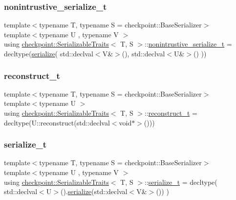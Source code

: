 \subsubsection{\texorpdfstring{nonintrustive\+\_\+serialize\+\_\+t}{nonintrustive\_serialize\_t}}
{\footnotesize\ttfamily template$<$typename T, typename S = checkpoint\+::\+Base\+Serializer$>$ \\
template$<$typename U , typename V $>$ \\
using \hyperlink{structcheckpoint_1_1_serializable_traits}{checkpoint\+::\+Serializable\+Traits}$<$ T, S $>$\+::\hyperlink{structcheckpoint_1_1_serializable_traits_a3284d2cfd29cfe429d5cf76186d3fe3c}{nonintrustive\+\_\+serialize\+\_\+t} =  decltype(\hyperlink{namespacecheckpoint_a075da4e7344cf037943362517e606c3a}{serialize}( std\+::declval$<$V\&$>$(), std\+::declval$<$U\&$>$() ))}

\mbox{\label{structcheckpoint_1_1_serializable_traits_a9f161977ecf1aed8a4ccd5d63768399a}} 
\subsubsection{\texorpdfstring{reconstruct\+\_\+t}{reconstruct\_t}}
{\footnotesize\ttfamily template$<$typename T, typename S = checkpoint\+::\+Base\+Serializer$>$ \\
template$<$typename U $>$ \\
using \hyperlink{structcheckpoint_1_1_serializable_traits}{checkpoint\+::\+Serializable\+Traits}$<$ T, S $>$\+::\hyperlink{structcheckpoint_1_1_serializable_traits_a9f161977ecf1aed8a4ccd5d63768399a}{reconstruct\+\_\+t} =  decltype(U\+::reconstruct(std\+::declval$<$void$\ast$$>$()))}

\mbox{\label{structcheckpoint_1_1_serializable_traits_a416ff19cd1038279ace5cb49e3a9fb7d}} 
\subsubsection{\texorpdfstring{serialize\+\_\+t}{serialize\_t}}
{\footnotesize\ttfamily template$<$typename T, typename S = checkpoint\+::\+Base\+Serializer$>$ \\
template$<$typename U , typename V $>$ \\
using \hyperlink{structcheckpoint_1_1_serializable_traits}{checkpoint\+::\+Serializable\+Traits}$<$ T, S $>$\+::\hyperlink{structcheckpoint_1_1_serializable_traits_a416ff19cd1038279ace5cb49e3a9fb7d}{serialize\+\_\+t} =  decltype( std\+::declval$<$U$>$().\hyperlink{namespacecheckpoint_a075da4e7344cf037943362517e606c3a}{serialize}(std\+::declval$<$V\&$>$()) )}


